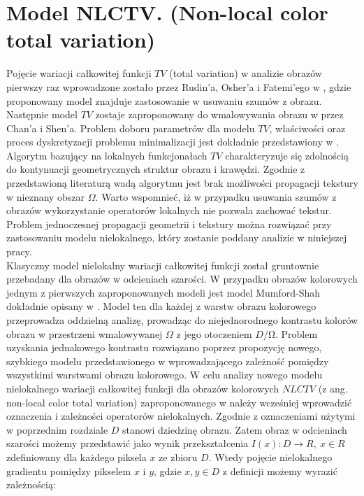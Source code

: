 \documentclass[12pt, twoside, openany]{report}
\theoremstyle{definition}
\begin{document}
\section{Model NLCTV. (Non-local color total variation)}
\label{sec:sNLCTV}
Pojęcie wariacji całkowitej funkcji $TV$ (total variation) w analizie obrazów pierwszy raz wprowadzone zostało przez Rudin'a, Osher'a i Fatemi’ego w \cite{rudin1992nonlinear}, gdzie proponowany model znajduje zastosowanie w usuwaniu szumów z obrazu. Następnie model $TV$ zostaje zaproponowany do wmalowywania obrazu w \cite{MathematicalModelsforNLTextureInpainting} przez Chan'a i Shen’a. Problem doboru parametrów dla modelu $TV$, właściwości oraz proces dyskretyzacji problemu minimalizacji jest dokładnie przedstawiony w \cite{getreuer2012total}. Algorytm bazujący na lokalnych funkcjonałach $TV$  charakteryzuje się zdolnością do kontynuacji geometrycznych struktur obrazu i krawędzi. Zgodnie z przedstawioną literaturą wadą algorytmu jest brak możliwości propagacji tekstury w nieznany obszar $\Omega$. Warto wspomnieć, iż w przypadku usuwania szumów z obrazów wykorzystanie operatorów lokalnych nie pozwala zachować tekstur. Problem jednoczesnej propagacji geometrii i tekstury można rozwiązać przy zastosowaniu modelu nielokalnego, który zostanie poddany analizie w niniejszej pracy. \\
Klasyczny model nielokalny wariacji całkowitej funkcji został gruntownie przebadany dla obrazów w odcieniach szarości. W przypadku obrazów kolorowych jednym z pierwszych zaproponowanych modeli jest model Mumford-Shah dokładnie opisany w \cite{jung2011nonlocal}. Model ten dla każdej z warstw obrazu kolorowego przeprowadza oddzielną analizę, prowadząc do niejednorodnego kontrastu kolorów obrazu w przestrzeni wmalowywanej $\Omega$ z jego otoczeniem $D/\mathrm{\Omega}$. Problem uzyskania jednakowego kontrastu rozwiązano poprzez propozycję nowego, szybkiego modelu przedstawionego w \cite{duan2015fast} wprowadzającego zależność pomiędzy wszystkimi warstwami obrazu kolorowego. W celu analizy nowego modelu nielokalnego wariacji całkowitej funkcji dla obrazów kolorowych $NLCTV$ (z ang. non-local color total variation) zaproponowanego w \cite{duan2015fast} należy wcześniej wprowadzić oznaczenia i zależności operatorów nielokalnych. 
Zgodnie z oznaczeniami użytymi w poprzednim rozdziale $D$ stanowi dziedzinę obrazu. Zatem obraz w odcieniach szarości możemy przedstawić jako wynik przekształcenia $I\left(x\right):D\longrightarrow R,\ x\in R$ zdefiniowany dla każdego piksela $x$ ze zbioru $D$. Wtedy pojęcie nielokalnego gradientu pomiędzy pikselem $x$ i $y$, gdzie $x,y\in D$ z definicji możemy wyrazić zależnością:
\end{document}
